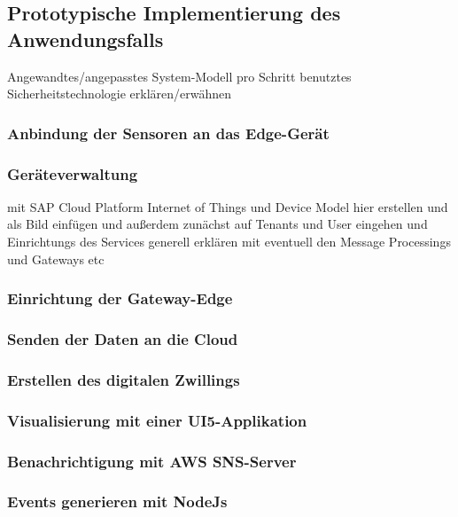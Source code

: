 \subsection{Prototypische Implementierung des Anwendungsfalls}
Angewandtes/angepasstes System-Modell
pro Schritt benutztes Sicherheitstechnologie erklären/erwähnen

\subsubsection{Anbindung der Sensoren an das Edge-Gerät}

\subsubsection{Geräteverwaltung}
mit SAP Cloud Platform Internet of Things und Device Model hier erstellen und als Bild einfügen und außerdem
zunächst auf Tenants und User eingehen und Einrichtungs des Services generell erklären mit eventuell den Message Processings
und Gateways etc

\subsubsection{Einrichtung der Gateway-Edge}

\subsubsection{Senden der Daten an die Cloud}

\subsubsection{Erstellen des digitalen Zwillings}

\subsubsection{Visualisierung mit einer UI5-Applikation}

\subsubsection{Benachrichtigung mit AWS SNS-Server}

\subsubsection{Events generieren mit NodeJs}

\newpage
